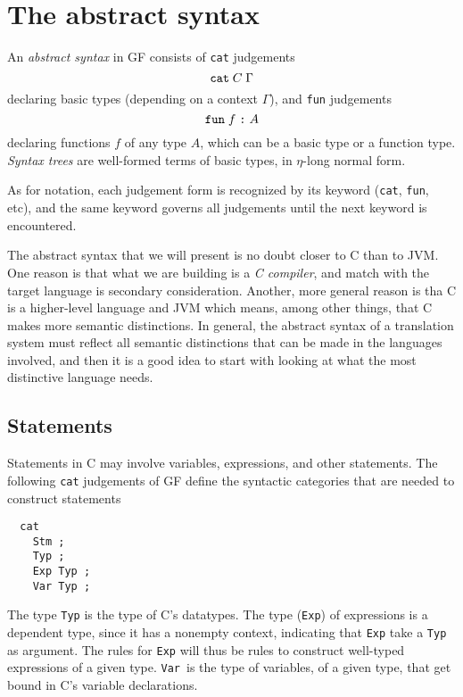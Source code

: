 \documentclass[12pt]{article}
\newcommand{\empha}[1]{{\em #1}}
\begin{document}
\section{The abstract syntax}

An \empha{abstract syntax} in GF consists of \texttt{cat} judgements
\[
\mbox{\texttt{cat}} \; C \; \Gamma
\]
declaring basic types (depending on a context $\Gamma$), 
and \texttt{fun} judgements 
\[
\mbox{\texttt{fun}} \; f \; \mbox{\texttt{:}} \; A
\]
declaring functions $f$ of any type $A$, which can be a basic type or
a function type.
\empha{Syntax trees} are well-formed terms of basic
types, in $\eta$-long normal form.

As for notation, each judgement form is recognized by
its keyword (\texttt{cat}, \texttt{fun}, etc), 
and the same keyword governs all judgements
until the next keyword is encountered.

The abstract syntax that we will present is no doubt closer
to C than to JVM. One reason is that what we are building is a
\textit{C compiler}, and match with the target language is
secondary consideration. Another, more general reason is tha
C is a higher-level language and JVM which means, among
other things, that C makes more semantic distinctions.
In general, the abstract syntax of a translation system
must reflect all semantic distinctions that can be made
in the languages involved, and then it is a good idea to
start with looking at what the most distinctive language
needs.



\subsection{Statements}

Statements in C may involve variables, expressions, and
other statements.
The following \texttt{cat} judgements of GF define the syntactic categories
that are needed to construct statements
\begin{verbatim}
  cat
    Stm ;
    Typ ;
    Exp Typ ;
    Var Typ ;
\end{verbatim}
The type \texttt{Typ} is the type of C's datatypes.
The type (\texttt{Exp}) of expressions is a dependent type, 
since it has a nonempty context, indicating that \texttt{Exp} take
a \texttt{Typ} as argument. The rules for \texttt{Exp}
will thus be rules to construct well-typed expressions of
a given type. \texttt{Var}\ is the type of variables,
of a given type, that get bound in C's variable
declarations.
\end{document}
